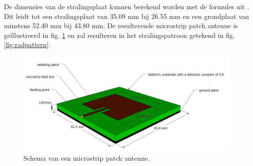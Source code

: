 \documentclass[twocolumn]{phdsymp_dutch}
\begin{document}
De dimensies van de stralingsplaat kunnen berekend worden met de formules uit \cite{J14_antennadesign,J15_antennadesign}.
Dit leidt tot een stralingsplaat van 35.09 mm bij 26.55 mm en  een grondplaat van minstens 52.40 mm bij 43.80 mm.
De resulterende microstrip patch antenne is ge\"illustreerd in fig. \ref{fig:basicpatchantenna} en zal resulteren 
in het stralingspatroon getekend in fig. \ref{fig:radpattern}.
\begin{figure}[h!]
\centering
  \includegraphics[width=\linewidth]{MicrostripAntenna.png}
  \caption{Schema van een microstrip patch antenne.}
  \label{fig:basicpatchantenna}
\end{figure}
\end{document}
